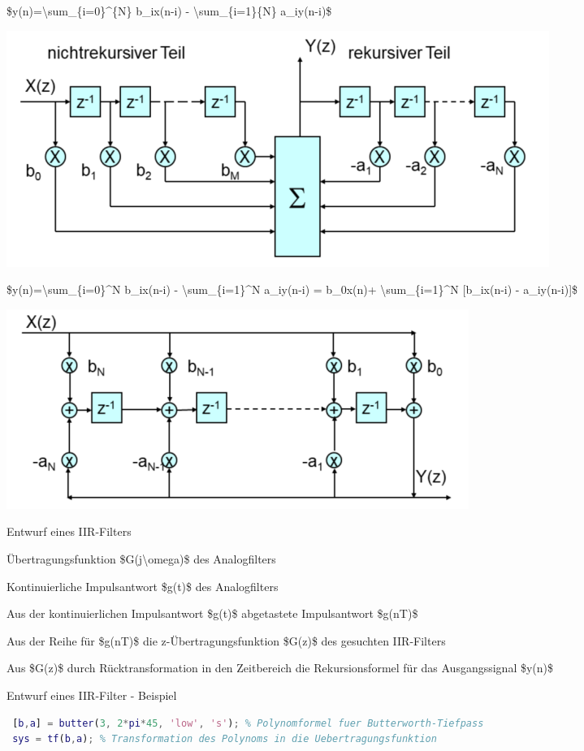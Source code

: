 \documentclass[a4paper]{article}
\begin{document}
\begin{multicols}{3}
  \begin{itemize*}
    \item \$y(n)=\textbackslash sum\_\{i=0\}\^{}\{N\} b\_ix(n-i) - \textbackslash sum\_\{i=1\}\{N\} a\_iy(n-i)\$
    \item \includegraphics[width=.5\linewidth]{Assets/Biosignalverarbeitung-iir-rekursiv.png}
    \item \$y(n)=\textbackslash sum\_\{i=0\}\^{}N b\_ix(n-i) - \textbackslash sum\_\{i=1\}\^{}N a\_iy(n-i) = b\_0x(n)+ \textbackslash sum\_\{i=1\}\^{}N {[}b\_ix(n-i) - a\_iy(n-i){]}\$
    \item \includegraphics[width=.5\linewidth]{Assets/Biosignalverarbeitung-iir-rekursiv-2.png}
  \end{itemize*}

  Entwurf eines IIR-Filters

  \begin{enumerate*}
    \def\labelenumi{\arabic{enumi}.}
    \item Übertragungsfunktion \$G(j\textbackslash omega)\$ des Analogfilters
    \item Kontinuierliche Impulsantwort \$g(t)\$ des Analogfilters
    \item Aus der kontinuierlichen Impulsantwort \$g(t)\$ abgetastete Impulsantwort \$g(nT)\$
    \item Aus der Reihe für \$g(nT)\$ die z-Übertragungsfunktion \$G(z)\$ des gesuchten IIR-Filters
    \item Aus \$G(z)\$ durch Rücktransformation in den Zeitbereich die Rekursionsformel für das Ausgangssignal \$y(n)\$
  \end{enumerate*}

  Entwurf eines IIR-Filter - Beispiel
  \begin{lstlisting}[language=matlab]
 % Analoger Tiefpass bei 45 Hz
 [b,a] = butter(3, 2*pi*45, 'low', 's'); % Polynomformel fuer Butterworth-Tiefpass
 sys = tf(b,a); % Transformation des Polynoms in die Uebertragungsfunktion
 

\end{lstlisting}
\end{multicols}
\end{document}
